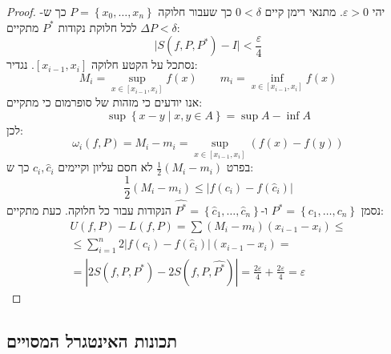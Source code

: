 \documentclass{tstextbook}
\begin{document}
\begin{proof}
יהי \(\varepsilon> 0\). מתנאי רימן קיים \(0< \delta\) כך שעבור חלוקה \(P=\left\{  x_{0},\dots,x_{n}  \right\}\) כך ש-\(\Delta P<\delta\) לכל חלוקת נקודות \(P^{*}\) מתקיים:
$$\lvert S(f,P,P^{*}) - I\rvert <\frac{\varepsilon}{4}$$
נסתכל על הקטע חלוקה \([x_{i-1},x_{i}]\). נגדיר:
$$M_{i}=\sup _{x \in [x_{i-1},x_{i}]} f(x)\qquad m_{i}=\inf _{x \in[x_{i-1},x_{i}]}f(x)$$
אנו יודעים כי מזהות של סופרמום כי מתקיים:
$$\sup \left\{  x-y \mid x,y \in A\right\}=\sup A-\inf A$$
לכן:
$$\omega_{i}(f,P)=M_{i}-m_{i}=\sup _{x \in[x_{i-1},x_{i}]} (f(x)-f(y))$$
בפרט \(\frac{1}{2}(M_{i}-m_{i})\) לא חסם עליון וקיימים \(c_{i},\hat{c}_{i}\) כך ש:
$$\frac{1}{2}(M_{i}-m_{i})\leq \lvert f(c_{i})-f\left( \hat{c}_{i} \right) \rvert $$
נסמן \(P^{*}=\left\{  c_{1},\dots, c_{n}  \right\}\) ו-\(\widehat{P^{*}}=\left\{  \hat{c}_{1},\dots,\hat{c}_{n}  \right\}\) הנקודות עבור כל חלוקה. כעת מתקיים:
$$\begin{gather}U(f,P)-L(f,P)=\sum (M_{i}-m_{i})(x_{i-1}-x_{i})\leq \\\leq \sum_{i=1}^{n} 2\left\lvert  f(c_{i})-f\left( \hat{c}_{i} \right)  \right\rvert (x_{i-1}-x_{i})= \\=\left\lvert  2S(f,P,P^{*})-2S\left( f,P,\widehat{P^{*}}  \right)  \right\rvert = \frac{2\varepsilon}{4}+\frac{2\varepsilon}{4}=\varepsilon
\end{gather}$$

\end{proof}
\subsection{תכונות האינטגרל המסויים}
\end{document}
